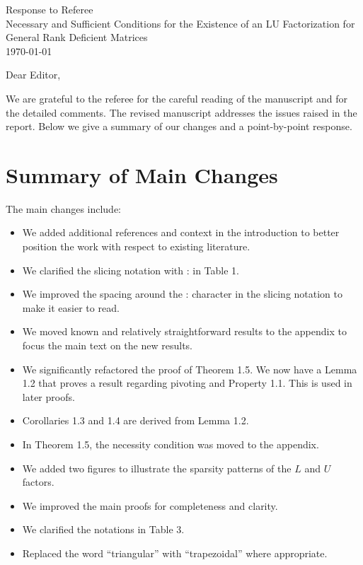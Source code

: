 \documentclass[11pt]{article}
\begin{document}
\begin{center}
  {\Large Response to Referee}\\[0.5em]
  {\large Necessary and Sufficient Conditions for the Existence of an LU Factorization for General Rank Deficient Matrices}\\[0.5em]
  \today
\end{center}

Dear Editor,

We are grateful to the referee for the careful reading of the manuscript and for the detailed comments. The revised manuscript addresses the issues raised in the report. Below we give a summary of our changes and a point-by-point response.

\section*{Summary of Main Changes}

The main changes include:
\begin{itemize}
  \item We added additional references and context in the introduction to better position the work with respect to existing literature.
  \item We clarified the slicing notation with : in Table 1.
  \item We improved the spacing around the : character in the slicing notation to make it easier to read.
  \item We moved known and relatively straightforward results to the appendix to focus the main text on the new results.
  \item We significantly refactored the proof of Theorem 1.5. We now have a Lemma 1.2 that proves a result regarding pivoting and Property 1.1. This is used in later proofs.
  \item Corollaries 1.3 and 1.4 are derived from Lemma 1.2.
  \item In Theorem 1.5, the necessity condition was moved to the appendix.
  \item We added two figures to illustrate the sparsity patterns of the $L$ and $U$ factors.
  \item We improved the main proofs for completeness and clarity.
  \item We clarified the notations in Table 3.
  \item Replaced the word ``triangular'' with ``trapezoidal'' where appropriate.
\end{itemize}
\end{document}
